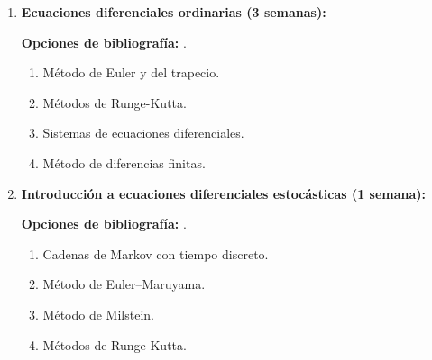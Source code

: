 \begin{refsection}
\begin{enumerate}
\textbf{Opciones de bibliografía:} \cite{trefethen97}.

\begin{enumerate}
	\item Algoritmos de diferentes factorizaciones (LU, QR, Cholesky, valores singulares).
	\item Resolución numérica de sistemas de ecuaciones lineales.
	\item Métodos iterativos para la resolución de sistemas de ecuaciones (Jacobi, Gauss-Seidel, gradiente con búsqueda de línea).
	\item Valores y vectores propios (Jacobi, Sturm, iteración de potencias).
	\item Problema de mínimos cuadrados. Mejor aproximación en la 2-norma.
	\item Sistemas de ecuaciones no lineales (Newton en varias variables).
	\item Aplicaciones de valores singulares.
	\item Introducción a tópicos en análisis de datos.
\end{enumerate}
	
\item \textbf{Ecuaciones diferenciales ordinarias (3 semanas):}

\textbf{Opciones de bibliografía:} \cite{Quarteroni,Suli2003}.

\begin{enumerate}
	\item Método de Euler y del trapecio.
	\item Métodos de Runge-Kutta.
	\item Sistemas de ecuaciones diferenciales.
	\item Método de diferencias finitas.
\end{enumerate}

\item \textbf{Introducción a ecuaciones diferenciales estocásticas (1 semana):}  %

\textbf{Opciones de bibliografía:} \cite{Zhang}.	
	
\begin{enumerate}
    \item Cadenas de Markov con tiempo discreto.
	\item Método de Euler–Maruyama.
	\item Método de Milstein.
	\item Métodos de Runge-Kutta.
\end{enumerate}
	

\end{enumerate}
\end{refsection}
